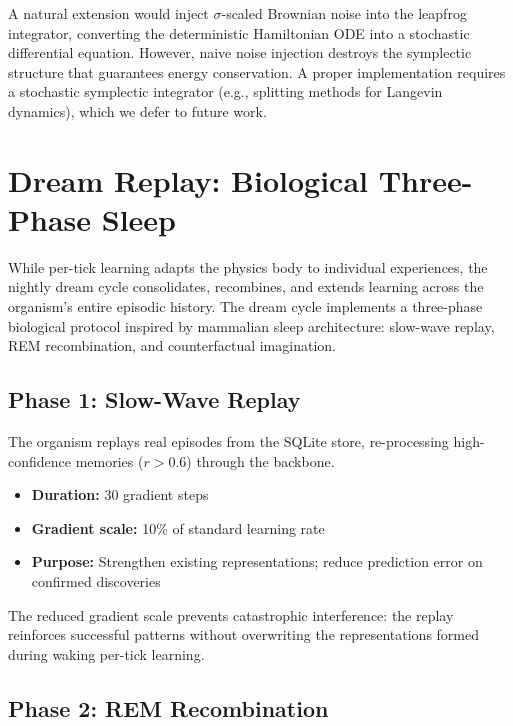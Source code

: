 \documentclass[11pt,a4paper,twocolumn]{article}
\begin{document}
A natural extension would inject $\sigma$-scaled Brownian noise into the leapfrog integrator, converting the deterministic Hamiltonian ODE into a stochastic differential equation.
However, naive noise injection destroys the symplectic structure that guarantees energy conservation.
A proper implementation requires a stochastic symplectic integrator (e.g., splitting methods for Langevin dynamics), which we defer to future work.

\section{Dream Replay: Biological Three-Phase Sleep}
\label{sec:dream_replay}

While per-tick learning adapts the physics body to individual experiences, the nightly dream cycle consolidates, recombines, and extends learning across the organism's entire episodic history.
The dream cycle implements a three-phase biological protocol inspired by mammalian sleep architecture: slow-wave replay, REM recombination, and counterfactual imagination.

\subsection{Phase 1: Slow-Wave Replay}

The organism replays real episodes from the SQLite store, re-processing high-confidence memories ($r > 0.6$) through the backbone.
\begin{itemize}
\item \textbf{Duration:} 30 gradient steps
\item \textbf{Gradient scale:} 10\% of standard learning rate
\item \textbf{Purpose:} Strengthen existing representations; reduce prediction error on confirmed discoveries
\end{itemize}
The reduced gradient scale prevents catastrophic interference: the replay reinforces successful patterns without overwriting the representations formed during waking per-tick learning.

\subsection{Phase 2: REM Recombination}
\end{document}
